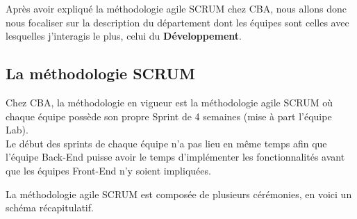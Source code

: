 \documentclass{article}
\begin{document}
Après avoir expliqué la méthodologie agile SCRUM chez CBA, nous allons donc nous focaliser sur la description du département dont les équipes sont celles avec lesquelles j'interagis le plus, celui du \textbf{Développement}.



\subsection{La méthodologie SCRUM}

Chez CBA, la méthodologie en vigueur est la méthodologie agile SCRUM où chaque équipe possède son propre Sprint de 4 semaines (mise à part l'équipe Lab). \\

Le début des sprints de chaque équipe n'a pas lieu en même temps afin que l'équipe Back-End puisse avoir le temps d'implémenter les fonctionnalités avant que les équipes Front-End n'y soient impliquées.

La méthodologie agile SCRUM est composée de plusieurs cérémonies, en voici un schéma récapitulatif.

\end{document}
